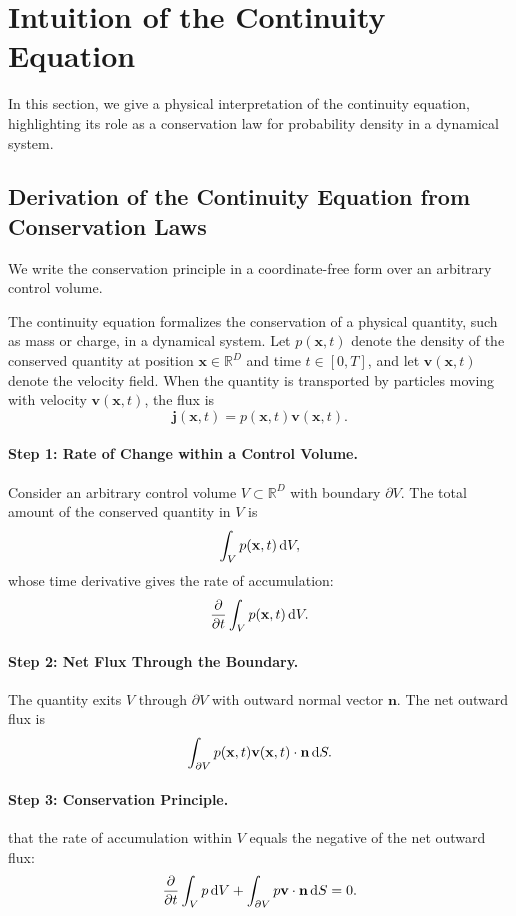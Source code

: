 \newpage
\clearpage

\section{Intuition of the Continuity Equation}\label{sec:intuition-continuity}
In this section, we give a physical interpretation of the continuity equation, highlighting its role as a conservation law for probability density in a dynamical system.

\subsection{Derivation of the Continuity Equation from Conservation Laws}

We write the conservation principle in a coordinate-free form over an arbitrary control volume.

The continuity equation formalizes the conservation of a physical quantity, such as mass or charge, in a dynamical system. Let $p(\mathbf{x}, t)$ denote the density of the conserved quantity at position $\mathbf{x} \in \mathbb{R}^D$ and time $t \in [0, T]$, and let $\mathbf{v}(\mathbf{x}, t)$ denote the velocity field. When the quantity is transported by particles moving with velocity $\mathbf{v}(\mathbf{x},t)$, the flux is
\[
\mathbf{j}(\mathbf{x},t)=p(\mathbf{x},t)\mathbf{v}(\mathbf{x},t).
\]

\paragraph{Step 1: Rate of Change within a Control Volume.}  
Consider an arbitrary control volume $V \subset \mathbb{R}^D$ with boundary $\partial V$. The total amount of the conserved quantity in $V$ is
\[
\int_V p(\mathbf{x}, t) \mathop{}\!\mathrm{d} V,
\]
whose time derivative gives the rate of accumulation:
\[
\frac{\partial}{\partial t} \int_V p(\mathbf{x}, t) \mathop{}\!\mathrm{d} V.
\]

\paragraph{Step 2: Net Flux Through the Boundary.}  
The quantity exits $V$ through $\partial V$ with outward normal vector $\mathbf{n}$. The net outward flux is
\[
\int_{\partial V} p(\mathbf{x}, t) \mathbf{v}(\mathbf{x}, t) \cdot \mathbf{n} \mathop{}\!\mathrm{d} S.
\]

\paragraph{Step 3: Conservation Principle.}  
 that the rate of accumulation within $V$ equals the negative of the net outward flux:
\[
\frac{\partial}{\partial t} \int_V p \mathop{}\!\mathrm{d} V + \int_{\partial V} p \mathbf{v} \cdot \mathbf{n} \mathop{}\!\mathrm{d} S = 0.
\]

